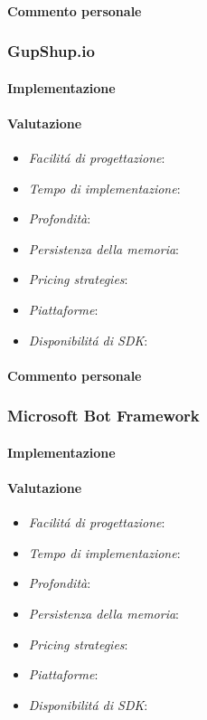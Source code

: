 \documentclass[]{article}
\begin{document}
\paragraph{Commento personale}

\subsubsection{GupShup.io}
\paragraph{Implementazione}
\paragraph{Valutazione}
\begin{itemize}
\item \textit{Facilitá di progettazione}: 
\item \textit{Tempo di implementazione}: 
\item \textit{Profondità}: 
\item \textit{Persistenza della memoria}: 
\item \textit{Pricing strategies}: 
\item \textit{Piattaforme}: 
\item \textit{Disponibilitá di SDK}: 
\end{itemize}
\paragraph{Commento personale}

\subsubsection{Microsoft Bot Framework}
\paragraph{Implementazione}
\paragraph{Valutazione}
\begin{itemize}
\item \textit{Facilitá di progettazione}: 
\item \textit{Tempo di implementazione}: 
\item \textit{Profondità}: 
\item \textit{Persistenza della memoria}: 
\item \textit{Pricing strategies}: 
\item \textit{Piattaforme}: 
\item \textit{Disponibilitá di SDK}: 
\end{itemize}
\end{document}
